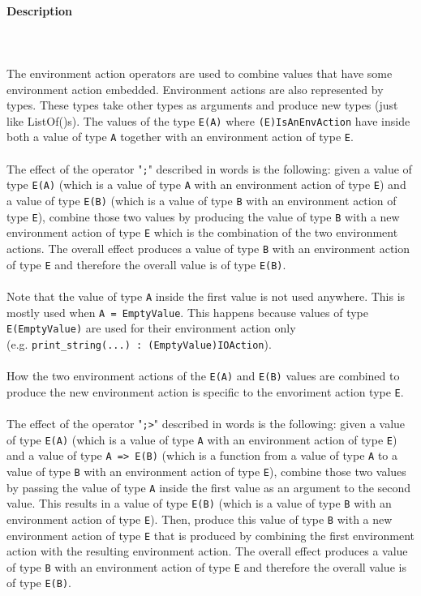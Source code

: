 \documentclass{article}
\def\pend{\mbox{} \\\\}
\begin{document}
\paragraph{Description}\pend
The environment action operators are used to combine values that have some
environment action embedded. Environment actions are also represented by
types. These types take other types as arguments and produce new types (just
like ListOf()s). The values of the type \texttt{E(A)} where
\texttt{(E)IsAnEnvAction} have inside both a value of type \texttt{A}
together with an environment action of type \texttt{E}.
\\\\
The effect of the operator "\texttt{;}" described in words is the following:
given a value of type \texttt{E(A)} (which is a value of type \texttt{A} with
an environment action of type \texttt{E}) and a value of type \texttt{E(B)}
(which is a value of type \texttt{B} with an environment action of type
\texttt{E}), combine those two values by producing the value of type \texttt{B}
with a new environment action of type \texttt{E} which is the combination of
the two environment actions. The overall effect produces a value of type
\texttt{B} with an environment action of type \texttt{E} and therefore the
overall value is of type \texttt{E(B)}.
\\\\
Note that the value of type \texttt{A} inside the first value is not used
anywhere. This is mostly used when \texttt{A = EmptyValue}.  This happens
because values of type \texttt{E(EmptyValue)} are used for their environment
action only \\(e.g. \texttt{print_string(...)\ :\ (EmptyValue)IOAction}).
\\\\
How the two environment actions of the \texttt{E(A)} and \texttt{E(B)} values
are combined to produce the new environment action is specific to the
envoriment action type \texttt{E}.
\\\\
The effect of the operator "\texttt{;>}" described in words is the following:
given a value of type \texttt{E(A)} (which is a value of type \texttt{A} with
an environment action of type \texttt{E}) and a value of type \texttt{A =>
E(B)} (which is a function from a value of type \texttt{A} to a value of type
\texttt{B} with an environment action of type \texttt{E}), combine those two
values by passing the value of type \texttt{A} inside the first value as an
argument to the second value. This results in a value of type \texttt{E(B)}
(which is a value of type \texttt{B} with an environment action of type
\texttt{E}).  Then, produce this value of type \texttt{B} with a new
environment action of type \texttt{E} that is produced by combining the first
environment action with the resulting environment action.  The overall effect
produces a value of type \texttt{B} with an environment action of type
\texttt{E} and therefore the overall value is of type \texttt{E(B)}.
\end{document}
